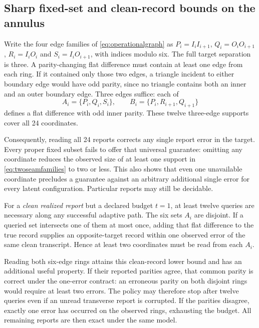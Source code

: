 \documentclass[11pt,a4paper]{article}
\theoremstyle{definition}\newtheorem{definition}[theorem]{Definition}
\begin{document}
\subsection{Sharp fixed-set and clean-record bounds on the annulus}
Write the four edge families of \eqref{eq:operationalgraph} as $P_i=I_iI_{i+1}$, $Q_i=O_iO_{i+1}$, $R_i=I_iO_i$ and $S_i=I_iO_{i+1}$, with indices modulo six. The full target separation is three. A parity-changing flat difference must contain at least one edge from each ring. If it contained only those two edges, a triangle incident to either boundary edge would have odd parity, since no triangle contains both an inner and an outer boundary edge. Three edges suffice: each of
\begin{equation}
 A_i=\{P_i,Q_i,S_i\},\qquad
 B_i=\{P_i,R_{i+1},Q_{i+1}\}
 \label{eq:twoseamfamilies}
\end{equation}
defines a flat difference with odd inner parity. These twelve three-edge supports cover all 24 coordinates.

Consequently, reading all 24 reports corrects any single report error in the target. Every proper fixed subset fails to offer that universal guarantee: omitting any coordinate reduces the observed size of at least one support in \eqref{eq:twoseamfamilies} to two or less. This also shows that even one unavailable coordinate precludes a guarantee against an arbitrary additional single error for every latent configuration. Particular reports may still be decidable.

For a \emph{clean realized report} but a declared budget $t=1$, at least twelve queries are necessary along any successful adaptive path. The six sets $A_i$ are disjoint. If a queried set intersects one of them at most once, adding that flat difference to the true record supplies an opposite-target record within one observed error of the same clean transcript. Hence at least two coordinates must be read from each $A_i$.

Reading both six-edge rings attains this clean-record lower bound and has an additional useful property. If their reported parities agree, that common parity is correct under the one-error contract: an erroneous parity on both disjoint rings would require at least two errors. The policy may therefore stop after twelve queries even if an unread transverse report is corrupted. If the parities disagree, exactly one error has occurred on the observed rings, exhausting the budget. All remaining reports are then exact under the same model.
\end{document}
